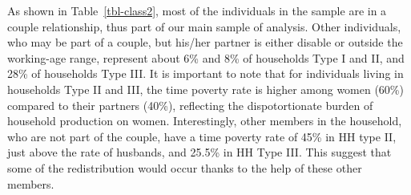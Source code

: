 \documentclass[
  11pt,
]{article}
\begin{document}
\begin{table}[H]

\caption{\label{tbl-class2}Individual Classification for Redistribution
Analysis: Time Poverty Rate}


\end{table}%

As shown in Table~\ref{tbl-class2}, most of the individuals in the
sample are in a couple relationship, thus part of our main sample of
analysis. Other individuals, who may be part of a couple, but his/her
partner is either disable or outside the working-age range, represent
about 6\% and 8\% of households Type I and II, and 28\% of households
Type III. It is important to note that for individuals living in
households Type II and III, the time poverty rate is higher among women
(60\%) compared to their partners (40\%), reflecting the dispotortionate
burden of household production on women. Interestingly, other members in
the household, who are not part of the couple, have a time poverty rate
of 45\% in HH type II, just above the rate of husbands, and 25.5\% in HH
Type III. This suggest that some of the redistribution would occur
thanks to the help of these other members.
\end{document}
